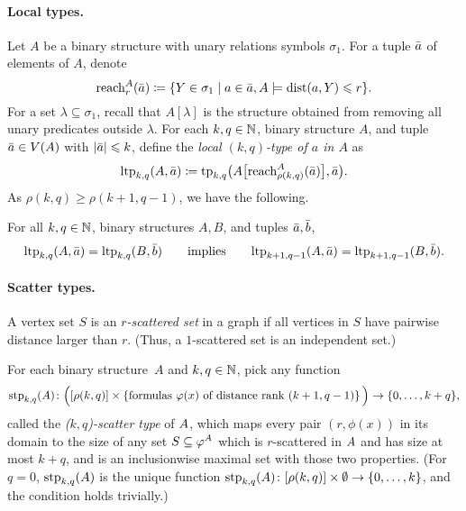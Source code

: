 \paragraph{Local types.}\label{par:local-type-def}
Let \(A\) be a binary structure with unary relations symbols \(\sigma_1\).
For a tuple $\bar a$ of elements of $A$, denote
$${\rm reach}^A_r(\bar a) \coloneqq  \{ Y \in \sigma_1 \mid a\in \bar a, A \models \mathrm{dist}(a,Y) \leqslant r \}.$$
For a set \(\lambda \subseteq \sigma_1\), recall that \(A[\lambda]\) is the structure obtained from removing
all unary predicates outside \(\lambda\).
For each $k,q\in\mathbb N$, binary structure $A$, and tuple \(\bar a\in V(A)\) with $|\bar a|\leqslant k$, define the \emph{local $(k,q)$-type of $a$ in $A$} as 
$$\textnormal{ltp}_{k,q}(A,\bar a) \coloneqq  \textnormal{tp}_{k,q}\bigl(A\bigl[{\rm reach}^A_{\rho(k,q)}(\bar a)\bigr],\bar a\bigr).$$
As ${\rho(k,q)\ge \rho(k+1,q-1)}$, we have the following.
\begin{observation}\label{obs:ltphered}
    For all $k,q\in\mathbb N$, binary structures \(A,B\), and tuples \(\bar a, \bar b\),
    $$\textnormal{ltp}_{k,q}(A, \bar a)= \textnormal{ltp}_{k,q}(B, \bar b)\qquad\text{implies}\qquad
    \textnormal{ltp}_{k+1,q-1}(A, \bar a)= \textnormal{ltp}_{k+1,q-1}(B, \bar b).$$
\end{observation}


\paragraph{Scatter types.}
A vertex set \(S\) is an \emph{\(r\)-scattered set} in a graph if all vertices in \(S\)
have pairwise distance larger than \(r\). (Thus, a \(1\)-scattered set is an independent set.)

For each binary structure~\(A\) and $k,q\in\mathbb N$, pick any function 
\[\textnormal{stp}_{k,q}(A)\colon \Big([\rho(k,q)]\times\left\{\text{formulas $\varphi(x)$ of distance rank \((k+1,q-1)\)}\right\}\Big)\to\{0,\ldots,k+q\},\]
called the \emph{(\(k,q\))-scatter type} of ${{A}}$, 
which maps every pair $(r,\phi(x))$ in its domain
to the size of any set $S\subseteq \varphi^{{A}}$ which is \(r\)-scattered in ${{A}}$ and has size at most $k+q$, and is an inclusionwise maximal set with those two properties.
(For $q=0$,  $\textnormal{stp}_{k,q}(A)$ is the unique function $\textnormal{stp}_{k,q}(A)\colon [\rho(k,q)]\times\emptyset\to\{0,\ldots,k\}$, and the condition holds trivially.)

